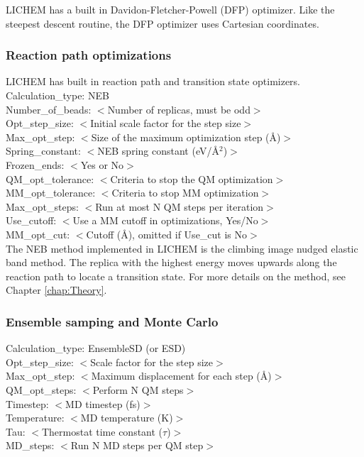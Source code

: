 \documentclass[12pt]{report}
\begin{document}
LICHEM has a built in Davidon-Fletcher-Powell (DFP) optimizer.
Like the steepest descent routine, the DFP optimizer uses Cartesian
coordinates.

\subsubsection{Reaction path optimizations}

LICHEM has built in reaction path and transition state optimizers. \\

Calculation\_type: NEB \\
Number\_of\_beads: $<$Number of replicas, must be odd$>$ \\
Opt\_step\_size: $<$Initial scale factor for the step size$>$ \\
Max\_opt\_step: $<$Size of the maximum optimization step (\AA)$>$ \\
Spring\_constant: $<$NEB spring constant (eV/\AA$^2$)$>$ \\
Frozen\_ends: $<$Yes or No$>$ \\
QM\_opt\_tolerance: $<$Criteria to stop the QM optimization$>$ \\
MM\_opt\_tolerance: $<$Criteria to stop MM optimization$>$ \\
Max\_opt\_steps: $<$Run at most N QM steps per iteration$>$ \\
Use\_cutoff: $<$Use a MM cutoff in optimizations, Yes/No$>$ \\
MM\_opt\_cut: $<$Cutoff (\AA), omitted if Use\_cut is No$>$ \\

The NEB method implemented in LICHEM is the climbing
image nudged elastic band method.
The replica with the highest energy moves upwards along the reaction
path to locate a transition state.
For more details on the method, see Chapter \ref{chap:Theory}.

\subsubsection{Ensemble samping and Monte Carlo}

Calculation\_type: EnsembleSD (or ESD) \\
Opt\_step\_size: $<$Scale factor for the step size$>$ \\
Max\_opt\_step: $<$Maximum displacement for each step (\AA)$>$ \\
QM\_opt\_steps: $<$Perform N QM steps$>$ \\
Timestep: $<$MD timestep (fs)$>$ \\
Temperature: $<$MD temperature (K)$>$ \\
Tau: $<$Thermostat time constant ($\tau$)$>$ \\
MD\_steps: $<$Run N MD steps per QM step$>$ \\
\end{document}
